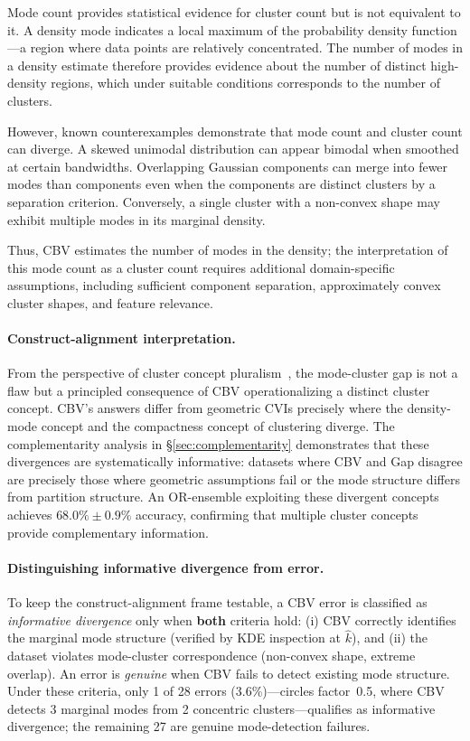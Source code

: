 \documentclass[journal]{IEEEtran}
\begin{document}
Mode count provides statistical evidence for cluster count but is not equivalent to it. A density mode indicates a local maximum of the probability density function---a region where data points are relatively concentrated. The number of modes in a density estimate therefore provides evidence about the number of distinct high-density regions, which under suitable conditions corresponds to the number of clusters.

However, known counterexamples demonstrate that mode count and cluster count can diverge. A skewed unimodal distribution can appear bimodal when smoothed at certain bandwidths. Overlapping Gaussian components can merge into fewer modes than components even when the components are distinct clusters by a separation criterion. Conversely, a single cluster with a non-convex shape may exhibit multiple modes in its marginal density.

Thus, CBV estimates the number of modes in the density; the interpretation of this mode count as a cluster count requires additional domain-specific assumptions, including sufficient component separation, approximately convex cluster shapes, and feature relevance.

\paragraph{Construct-alignment interpretation.}
From the perspective of cluster concept pluralism~\cite{hennig2015true}, the mode-cluster gap is not a flaw but a principled consequence of CBV operationalizing a distinct cluster concept. CBV's answers differ from geometric CVIs precisely where the density-mode concept and the compactness concept of clustering diverge. The complementarity analysis in §\ref{sec:complementarity} demonstrates that these divergences are systematically informative: datasets where CBV and Gap disagree are precisely those where geometric assumptions fail or the mode structure differs from partition structure. An OR-ensemble exploiting these divergent concepts achieves $68.0\% \pm 0.9\%$ accuracy, confirming that multiple cluster concepts provide complementary information.

\paragraph{Distinguishing informative divergence from error.}
To keep the construct-alignment frame testable, a CBV error is classified as \emph{informative divergence} only when \textbf{both} criteria hold: (i) CBV correctly identifies the marginal mode structure (verified by KDE inspection at $\hat{k}$), and (ii) the dataset violates mode-cluster correspondence (non-convex shape, extreme overlap). An error is \emph{genuine} when CBV fails to detect existing mode structure. Under these criteria, only 1 of 28 errors (3.6\%)---circles factor~0.5, where CBV detects 3 marginal modes from 2 concentric clusters---qualifies as informative divergence; the remaining 27 are genuine mode-detection failures.
\end{document}
